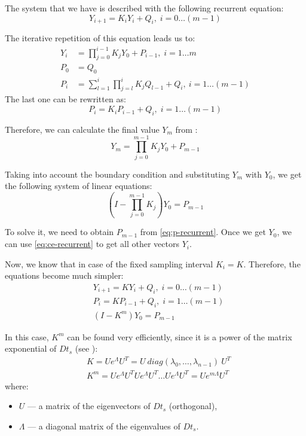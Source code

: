 The system that we have is described with the following recurrent equation:
\begin{equation} \label{eq:ce-recurrent}
  Y_{i + 1} = K_i Y_i + Q_i, \; i = 0 \dots (m - 1)
\end{equation}

The iterative repetition of this equation leads us to:
\begin{align}
  Y_i & = \prod_{j = 0}^{i - 1} K_j Y_0 + P_{i - 1}, \; i = 1 \dots m \label{eq:y-recurrent} \\
  P_0 & = Q_0 \nonumber \\
  P_i & = \sum_{l = 1}^i \prod_{j = l}^i K_j Q_{l - 1} + Q_i, \: i = 1 \dots (m - 1) \nonumber
\end{align}
The last one can be rewritten as:
\begin{equation} \label{eq:p-recurrent}
  P_i = K_i P_{i - 1} + Q_i, \; i = 1 \dots (m - 1)
\end{equation}

Therefore, we can calculate the final value $Y_m$ from :
\[
  Y_m = \prod_{j = 0}^{m - 1} K_j Y_0 + P_{m - 1}
\]

Taking into account the boundary condition  and substituting $Y_m$ with $Y_0$, we get the following system of linear equations:
\[
  (I - \prod_{j = 0}^{m - 1} K_j) Y_0 = P_{m - 1}
\]

To solve it, we need to obtain $P_{m - 1}$ from \eqref{eq:p-recurrent}. Once we get $Y_0$, we can use \eqref{eq:ce-recurrent} to get all other vectors $Y_i$.

Now, we know that in case of the fixed sampling interval $K_i = K$. Therefore, the equations become much simpler:
\begin{align}
  & Y_{i + 1} = K Y_i + Q_i, \; i = 0 \dots (m - 1) \nonumber \\
  & P_i = K P_{i - 1} + Q_i, \; i = 1 \dots (m - 1) \nonumber \\
  & (I - K^m) Y_0 = P_{m - 1} \label{eq:linear-system}
\end{align}

In this case, $K^m$ can be found very efficiently, since it is a power of the matrix exponential of $D t_s$ (see ):
\begin{align*}
  & K = U e^{\Lambda} U^T = U \: diag(\lambda_0, \dots, \lambda_{n - 1}) \: U^T \\
  & K^m = U e^{\Lambda} U^T U e^{\Lambda} U^T \dots U e^{\Lambda} U^T = U e^{m \Lambda} U^T
\end{align*}
where:
\begin{itemize}
  \item $U$ --- a matrix of the eigenvectors of $D t_s$ (orthogonal),
  \item $\Lambda$ --- a diagonal matrix of the eigenvalues of $D t_s$.
\end{itemize}

